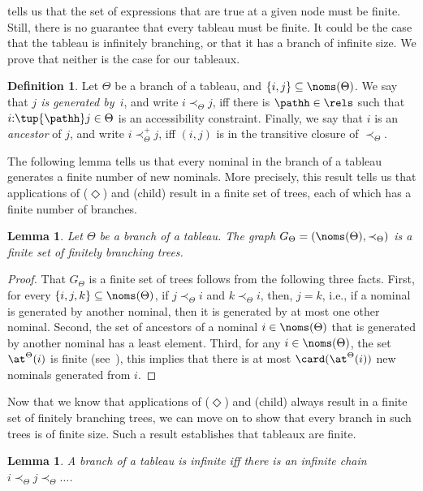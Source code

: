\documentclass[10pt,a4paper]{amsart}
\newtheorem{lem}[thm]{Lemma}
\theoremstyle{definition}
\newtheorem{defi}[thm]{Definition}
\theoremstyle{remark}
\begin{document}
 tells us that the set of expressions that are true at a given node must be finite. Still, there is no guarantee that every tableau must be finite. It could be the case that the tableau is infinitely branching, or that it has a branch of infinite size. We prove that neither is the case for our tableaux.

\begin{defi} \label{def:generated}
  Let $\Theta$ be a branch of a tableau, and $\{i, j\} \subseteq \noms(\Theta)$.
  We say that \emph{$j$ is generated by~$i$}, and write $i \prec_\Theta j$, iff there is $\pathh\in\rels$ such that $i{:}\tup{\pathh}j\in\Theta$ is an accessibility constraint. 
  Finally, we say that $i$ is an \emph{ancestor} of $j$, 
    and write $i \prec_\Theta^{+} j$,
  iff $(i,j)$ is in the transitive closure of $\prec_\Theta$.
\end{defi}

The following lemma tells us that every nominal in the branch of a tableau generates a finite number of new nominals. More precisely, this result tells us that applications of ($\Diamond$) and (child) result in a finite set of trees, each of which has a finite number of branches.

\begin{lem} \label{lemma:graph}
  Let $\Theta$ be a branch of a tableau.
  The graph $G_{\Theta} = (\noms(\Theta), \prec_\Theta)$ is a finite set of finitely branching trees.
\end{lem}
\begin{proof}
  That $G_{\Theta}$ is a finite set of trees follows from the following three facts.
  First, for every $\{i,j,k\} \subseteq \noms(\Theta)$, if $j \prec_\Theta i$ and $k \prec_\Theta i$, then, $j = k$, i.e., if a nominal is generated by another nominal, then it is generated by at most one other nominal.
  Second, the set of ancestors of a nominal $i \in \noms(\Theta)$ that is generated by another nominal has a least element.
  Third, for any $i \in \noms(\Theta)$, the set $\at^\Theta(i)$ is finite (see~), this implies that there is at most $\card(\at^\Theta(i))$ new nominals generated from $i$.
\end{proof}

Now that we know that applications of ($\Diamond$) and (child) always result in a finite set of finitely branching trees, we can move on to show that every branch in such trees is of finite size. Such a result establishes that tableaux are finite. 

\begin{lem} \label{lemma:chain{:}infinite}
  A branch of a tableau is infinite iff there is an infinite chain $i \prec_\Theta j  \prec_\Theta \dots$.
\end{lem}
\end{document}
